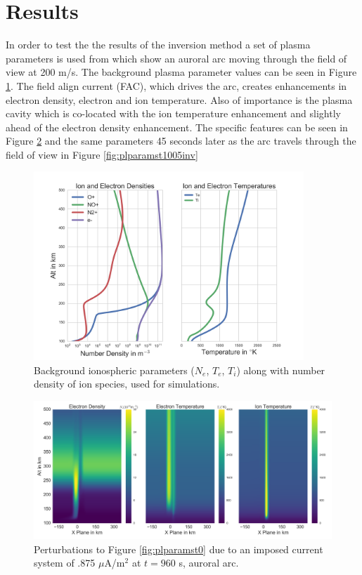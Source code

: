 \section{Results}
\label{sec:results}
In order to test the the results of the inversion method a set of plasma parameters is used from \cite{Perry:2015jf} which show an auroral arc moving through the field of view at 200 m/s. The background plasma parameter values can be seen in Figure \ref{fig:plparamst0inv}. The field align current (FAC), which drives the arc, creates enhancements in electron density, electron and ion temperature. Also of importance is the plasma cavity which is co-located with the ion temperature enhancement and slightly ahead of the electron density enhancement. The specific features can be seen in Figure \ref{fig:plparamst960inv} and the same parameters 45 seconds later as the arc travels through the field of view in Figure \ref{fig:plparamst1005inv}

\begin{figure}[!ht]
\centering
\includegraphics[width=4in]{backgroundallparams}
\caption{Background ionospheric parameters ($N_e$, $T_e$, $T_i$) along with number density of ion species, used for simulations.}
\label{fig:plparamst0inv}
\end{figure}

\begin{figure}[!ht]
\centering
\includegraphics[width=6in]{0960_15_int}
\caption{Perturbations to Figure \ref{fig:plparamst0} due to an imposed current system of .875 $\mu$A/m$^2$ at $t=960$ s, auroral arc.}
\label{fig:plparamst960inv}
\end{figure}


